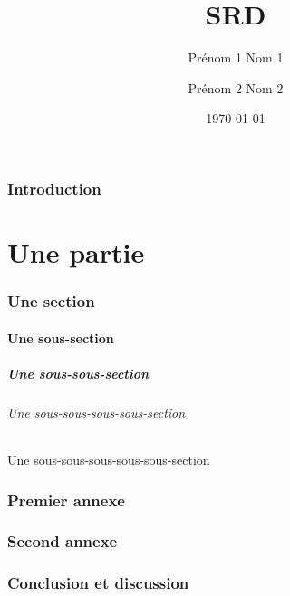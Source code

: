 \documentclass[a4paper]{article}
\title{SRD}
\author{Prénom 1 Nom 1 \and Prénom 2 Nom 2}
\date{\today}
\begin{document}
\maketitle

    \section*{Introduction}

    \part{Une partie}
    \section{Une section}
    \subsection{Une sous-section}
    \subsubsection{Une sous-sous-section}
    \paragraph{Une sous-sous-sous-sous-section}
    \subparagraph{Une sous-sous-sous-sous-sous-section}

    \appendix

    \section{Premier annexe}
    \section{Second annexe}

    \section{Conclusion et discussion}

    \tableofcontents    %
    \listoffigures        %
    \listoftables        %

\end{document}

